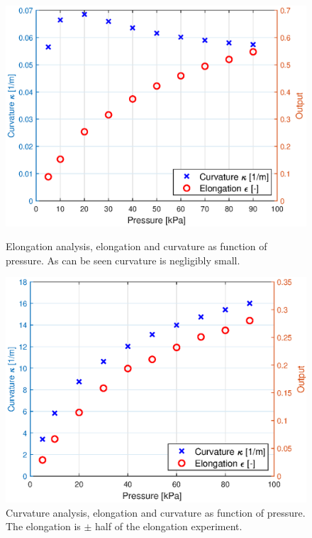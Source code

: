 \begin{figure}[H]
    \centering
\begin{minipage}{0.5\textwidth}
        \centering
        \includegraphics[width=\textwidth]{Figures/Chapter3/elongationvspressure.eps} 
        \caption{Elongation analysis, elongation and curvature as function of pressure. As can be seen curvature is negligibly small. }
        \label{fig3:elongationvspressure}
    \end{minipage}\hfill
    \begin{minipage}{0.5\textwidth}
        \centering
        \includegraphics[width=\textwidth]{Figures/Chapter3/rotationvspressure.eps} 
        \caption{Curvature analysis, elongation and curvature as function of pressure. The elongation is $\pm$ half of the elongation experiment.}
        \label{fig3:rotationvspressure}
    \end{minipage}
\end{figure}

